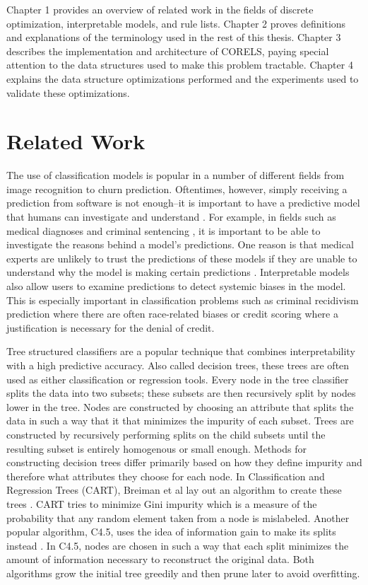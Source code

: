 \documentclass[]{report}
\theoremstyle{definition}
\begin{document}
Chapter 1 provides an overview of related work in the fields of discrete optimization, interpretable models, and rule lists. 
Chapter 2 proves definitions and explanations of the terminology used in the rest of this thesis.
Chapter 3 describes the implementation and architecture of CORELS, paying special attention to the data structures used to make this problem tractable.
Chapter 4 explains the data structure optimizations performed and the experiments used to validate these optimizations.

\chapter{Related Work}

The use of classification models is popular in a number of different fields from image recognition to churn prediction.
Oftentimes, however, simply receiving a prediction from software is not enough--it is important to have a predictive model that humans can investigate and understand \cite{Ruping06, Bratko97, Quinlan99, Martens11, Freitas14}.
For example, in fields such as medical diagnoses \cite{BellazziZu08} and criminal sentencing \cite{LarsonMaKiAn16}, it is important to be able to investigate the reasons behind a model's predictions.
One reason is that medical experts are unlikely to trust the predictions of these models if they are unable to understand why the model is making certain predictions \cite{Lavrač99}.
Interpretable models also allow users to examine predictions to detect systemic biases in the model.
This is especially important in classification problems such as criminal recidivism prediction where there are often race-related biases\cite{LarsonMaKiAn16} or credit scoring where a justification is necessary for the denial of credit\cite{BaesensMuDeVaSe05}.

Tree structured classifiers are a popular technique that combines interpretability with a high predictive accuracy.
Also called decision trees, these trees are often used as either classification or regression tools.
Every node in the tree classifier splits the data into two subsets; these subsets are then recursively split by nodes lower in the tree.
Nodes are constructed by choosing an attribute that splits the data in such a way that it that minimizes the impurity of each subset.
Trees are constructed by recursively performing splits on the child subsets until the resulting subset is entirely homogenous or small enough.
Methods for constructing decision trees differ primarily based on how they define impurity and therefore what attributes they choose for each node.
In Classification and Regression Trees (CART), Breiman et al lay out an algorithm to create these trees \cite{BreimanFrOlSt84}.
CART tries to minimize Gini impurity which is a measure of the probability that any random element taken from a node is mislabeled.
Another popular algorithm, C4.5, uses the idea of information gain to make its splits instead \cite{Quinlan93}.
In C4.5, nodes are chosen in such a way that each split minimizes the amount of information necessary to reconstruct the original data.
Both algorithms grow the initial tree greedily and then prune later to avoid overfitting.
\end{document}
